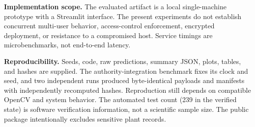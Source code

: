 \textbf{Implementation scope.} The evaluated artifact is a local single-machine prototype with a Streamlit interface. The present experiments do not establish concurrent multi-user behavior, access-control enforcement, encrypted deployment, or resistance to a compromised host. Service timings are microbenchmarks, not end-to-end latency.

\textbf{Reproducibility.} Seeds, code, raw predictions, summary JSON, plots, tables, and hashes are supplied. The authority-integration benchmark fixes its clock and seed, and two independent runs produced byte-identical payloads and manifests with independently recomputed hashes. Reproduction still depends on compatible OpenCV and system behavior. The automated test count (239 in the verified state) is software verification information, not a scientific sample size. The public package intentionally excludes sensitive plant records.